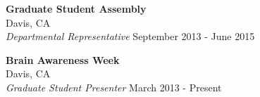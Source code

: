 \documentclass[line,margin,10pt]{res}
\begin{document}
\begin{resume}
\textbf{Graduate Student Assembly}\\Davis, CA\\{\sl Departmental Representative} \hfill September 2013 - June 2015
 
 \textbf{Brain Awareness Week}\\ Davis, CA\\{\sl Graduate Student Presenter} \hfill March 2013 - Present
 

\end{resume}
\end{document}
